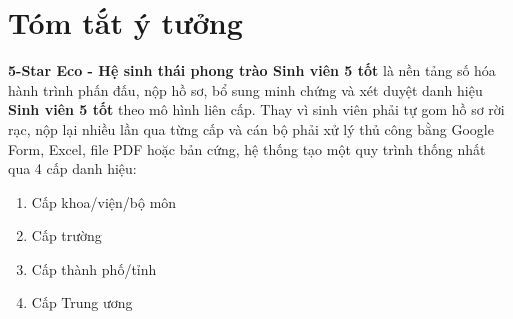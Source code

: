 \section{Tóm tắt ý tưởng}

\textbf{5-Star Eco - Hệ sinh thái phong trào Sinh viên 5 tốt} là nền tảng số hóa hành trình phấn đấu, nộp hồ sơ, bổ sung minh chứng và xét duyệt danh hiệu \textbf{Sinh viên 5 tốt} theo mô hình liên cấp. Thay vì sinh viên phải tự gom hồ sơ rời rạc, nộp lại nhiều lần qua từng cấp và cán bộ phải xử lý thủ công bằng Google Form, Excel, file PDF hoặc bản cứng, hệ thống tạo một quy trình thống nhất qua 4 cấp danh hiệu:

\begin{enumerate}
    \item Cấp khoa/viện/bộ môn
    \item Cấp trường
    \item Cấp thành phố/tỉnh
    \item Cấp Trung ương
\end{enumerate}